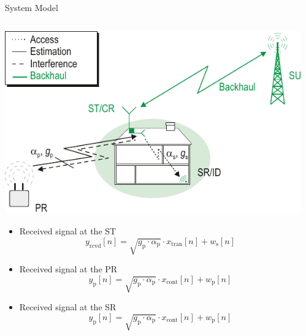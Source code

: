 \documentclass[12pt]{beamer}
\newcommand{\sub}[1]{_{\text{#1}}}
\newcommand{\xreg}{x\sub{cont}}
\newcommand{\yrcvd}{y\sub{rcvd}}
\newcommand{\xtran}{x\sub{tran}}
\newcommand{\yp}{y\sub{p}}
\newcommand{\nap}{w\sub{p}}
\newcommand{\nas}{w\sub{s}}
\newcommand{\gp}{g\sub{p}}
\newcommand{\ap}{\alpha\sub{p}}
\newcommand{\fs}[2]{\fontsize{#1 pt}{#2}\selectfont}
\begin{document}
\begin{frame}{System Model}
        \vspace{-0.5cm}
        \fs{8}{8}
        \begin{columns}[t]
                \begin{column}{0.4 \paperwidth}
        	\begin{center}
     		   	\includegraphics[width = 0.38 \paperwidth]{../figures/CR_Scenario_Underlay}
       		\end{center}
		\vspace{-0.4cm}
		\begin{itemize}
                     \item Received signal at the ST
			\begin{equation*}
				\yrcvd[n] = \sqrt{\gp \cdot \ap} \cdot \xtran[n] + \nas[n]
			\end{equation*}
                     \item Received signal at the PR
			\begin{equation*}
				\yp[n] = \sqrt{\gp \cdot \ap} \cdot \xreg[n] + \nap[n]
			\end{equation*}
                     \item Received signal at the SR 
			\begin{equation*}
				\yp[n] = \sqrt{\gp \cdot \ap} \cdot \xreg[n] + \nap[n]
			\end{equation*}
		\end{itemize}
                \end{column}
                \begin{column}{0.4 \paperwidth}
                \begin{itemize}

\end{itemize}
\end{column}
\end{columns}
\end{frame}
\end{document}
